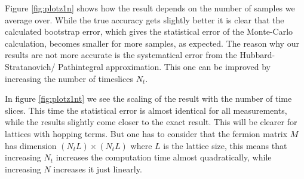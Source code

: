 Figure \ref{fig:plotz1n} shows how the result depends on the number of samples we average over. While the true accuracy gets slightly better it is clear that the calculated bootstrap error, which gives the statistical error of the Monte-Carlo calculation, becomes smaller for more samples, as expected. The reason why our results are not more accurate is the systematical error from the Hubbard-Stratanovich/ Pathintegral approximation. This one can be improved by increasing the number of timeslices $N_t$.

In figure \ref{fig:plotz1nt} we see the scaling of the result with the number of time slices. This time the statistical error is almost identical for all measurements, while the results slightly come closer to the exact result. This will be clearer for lattices with hopping terms. But one has to consider that the fermion matrix $M$ has dimension $(N_tL)\times(N_tL)$ where $L$ is the lattice size, this means that increasing $N_t$ increases the computation time almost quadratically, while increasing $N$ increases it just linearly.
